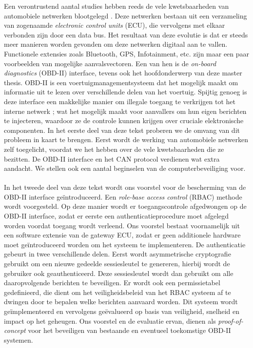 \documentclass[master=cws,masteroption=vs,english,extralanguage=dutch]{kulemt}
\begin{document}
\begin{abstract*}
\foreignlanguage{Dutch}{Een verontrustend aantal studies hebben reeds de vele kwetsbaarheden van automobiele netwerken blootgelegd \cite{Kosher,Kosher2,TPMS,MillerA,Pike15,Tuhoy,Pan,Petit}. Deze netwerken bestaan uit een verzameling van zogenaamde \textit{electronic control units} (ECU), die vervolgens met elkaar verbonden zijn door een data bus. Het resultaat van deze evolutie is dat er steeds meer manieren worden gevonden om deze netwerken digitaal aan te vallen. Functionele extensies zoals Bluetooth, GPS, Infotainment, etc. zijn maar een paar voorbeelden van mogelijke aanvalsvectoren. Een van hen is de \textit{on-board diagnostics} (OBD-II) interface, tevens ook het hoofdonderwerp van deze master thesis. OBD-II is een voertuigmanagementsysteem dat het mogelijk maakt om informatie uit te lezen over verschillende delen van het voertuig. Spijtig genoeg is deze interface een makkelijke manier om illegale toegang te verkrijgen tot het interne netwerk \cite{MillerA,Yadav16,MillerB,MillerC}; wat het mogelijk maakt voor aanvallers om hun eigen berichten te injecteren, waardoor ze de controle kunnen krijgen over cruciale elektronische componenten. In het eerste deel van deze tekst proberen we de omvang van dit probleem in kaart te brengen. Eerst wordt de werking van automobiele netwerken zelf toegelicht, voordat we het hebben over de vele kwetsbaarheden die ze bezitten. De OBD-II interface en het CAN protocol verdienen wat extra aandacht. We stellen ook een aantal beginselen van de computerbeveiliging voor.} \\ \\ 
\foreignlanguage{Dutch}{In het tweede deel van deze tekst wordt ons voorstel voor de bescherming van de OBD-II interface ge\"{i}ntroduceerd. Een \textit{role-base access control} (RBAC) methode wordt voorgesteld. Op deze manier wordt er toegangscontrole afgedwongen op de OBD-II interface, zodat er eerste een authenticatieprocedure moet afgelegd worden voordat toegang wordt verleend. Ons voorstel bestaat voornamelijk uit een software extensie van de gateway ECU, zodat er geen additionele hardware moet ge\"{i}ntroduceerd worden om het systeem te implementeren. De authenticatie gebeurt in twee verschillende delen. Eerst wordt asymmetrische cryptografie gebruikt om een nieuwe gedeelde sessiesleutel te genereren, hierbij wordt de gebruiker ook geauthenticeerd. Deze sessiesleutel wordt dan gebruikt om alle daaropvolgende berichten te beveiligen. Er wordt ook een permissietabel gedefinieerd, die dient om het veiligheidsbeleid van het RBAC systeem af te dwingen door te bepalen welke berichten aanvaard worden. Dit systeem wordt ge\"{i}mplementeerd en vervolgens ge\"{e}valueerd op basis van veiligheid, snelheid en impact op het geheugen. Ons voorstel en de evaluatie ervan, dienen als \textit{proof-of-concept} voor het beveiligen van bestaande en eventueel toekomstige OBD-II systemen.}
\end{abstract*}
	
\end{document}
